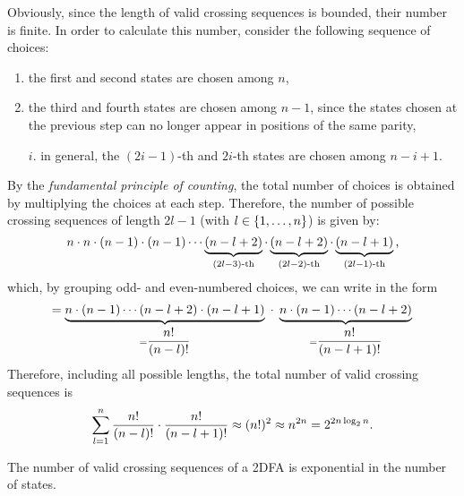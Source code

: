 Obviously, since the length of valid crossing sequences is bounded, their number is finite.
In order to calculate this number, consider the following sequence of choices:
\begin{enumerate}
	\item \label{itm:num-crosseq-1} the first and second states are chosen among $n$,
	\item the third and fourth states are chosen among $n-1$, since the states chosen at the previous step can no longer appear in positions of the same parity,
	\item[$i$.] in general, the $(2i-1)$-th and $2i$-th states are chosen among $n-i+1$.
\end{enumerate}
By the \emph{fundamental principle of counting}, the total number of choices is obtained by multiplying the choices at each step.
Therefore, the number of possible crossing sequences of length $2l-1$ (with $l\in\{1,\dots,n\}$) is given by:
\begin{equation*}
	n \cdot n \cdot (n-1) \cdot (n-1) \cdots \underbrace{(n-l+2)}_{(2l-3)\text{-th}} \cdot \underbrace{(n-l+2)}_{(2l-2)\text{-th}} \cdot \underbrace{(n-l+1)}_{(2l-1)\text{-th}} \text,
\end{equation*}
which, by grouping odd- and even-numbered choices, we can write in the form
\begin{equation*}
	= \underbrace{n \cdot (n-1) \cdots (n-l+2) \cdot (n-l+1)}_{=\dfrac{n!}{(n-l)!}} \; \cdot \; \underbrace{n \cdot (n-1) \cdots (n-l+2)}_{=\dfrac{n!}{(n-l+1)!}} \\
\end{equation*}
Therefore, including all possible lengths, the total number of valid crossing sequences is
\begin{align*}
	\sum_{l=1}^n \frac{n!}{(n-l)!}\cdot\frac{n!}{(n-l+1)!} \approx (n!)^2 \approx n^{2n} = 2^{2n \log_2 n} \text.
\end{align*}

\begin{fact}\label{fact:crossing-2DFA-num}
	The number of valid crossing sequences of a 2DFA is exponential in the number of states.
\end{fact}


